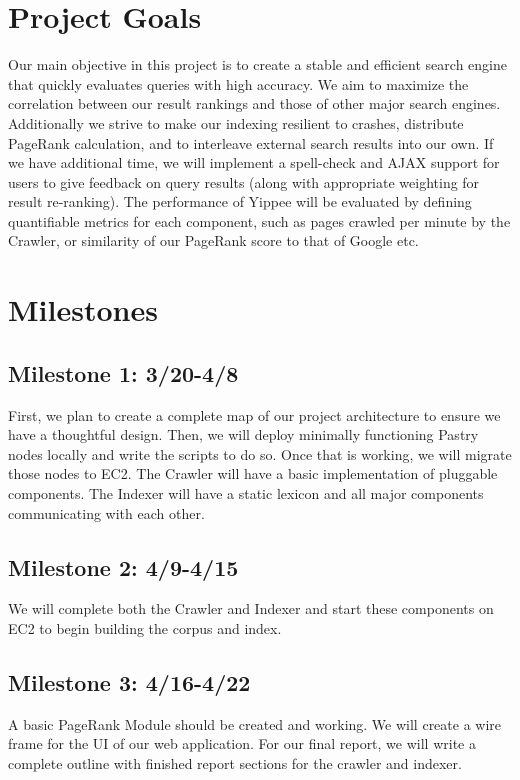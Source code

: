 \documentclass[11pt, letterpaper, oneside, twocolumn]{article}
\begin{document}
\section{ Project Goals }
\label{sec:goals}


Our main objective in this project is to create a stable and efficient search engine that quickly evaluates queries with high accuracy. We aim to maximize the correlation between our result rankings and those of other major search engines. Additionally we strive to make our indexing resilient to crashes, distribute PageRank calculation, and to interleave external search results into our own. If we have additional time, we will implement a spell-check and AJAX support for users to give feedback on query results (along with appropriate weighting for result re-ranking). The performance of Yippee will be evaluated by defining quantifiable metrics for each component, such as pages crawled per minute by the Crawler, or similarity of our PageRank score to that of Google etc.

\section{ Milestones }
\label{sec:milestones}

\subsection{Milestone 1: 3/20-4/8}
First, we plan to create a complete map of our project architecture to ensure we
have a thoughtful design. Then, we will deploy minimally functioning
Pastry nodes locally and write the scripts to do so. Once that is
working, we will migrate those nodes to EC2. The Crawler will have a basic
implementation of pluggable components. The Indexer will have a static lexicon
and all major components communicating with each other. 


\subsection{Milestone 2: 4/9-4/15}
We will complete both the Crawler and Indexer and start these components on EC2
to begin building the corpus and index. 


\subsection{Milestone 3: 4/16-4/22}
A basic PageRank Module should be created and working. We will create a wire
frame for the UI of our web application. For our final report, we will write a complete outline with finished report sections for the crawler
and indexer. 
\end{document}
